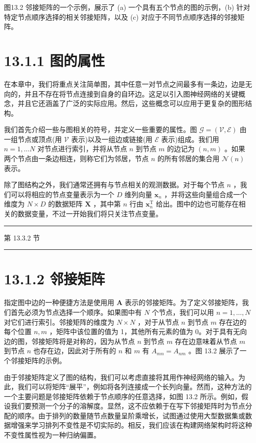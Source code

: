 \documentclass[10pt]{report}
\newcommand{\HRule}{\begin{center}\rule{0.9\linewidth}{0.2mm}\end{center}}
\begin{document}
图13.2 邻接矩阵的一个示例，展示了 (a) 一个具有五个节点的图的示例，(b) 针对特定节点顺序选择的相关邻接矩阵，以及 (c) 对应于不同节点顺序选择的邻接矩阵。

\section*{13.1.1 图的属性}

在本章中，我们将重点关注简单图，其中任意一对节点之间最多有一条边，边是无向的，并且不存在将节点连接到自身的自环边。这足以引入图神经网络的关键概念，并且它还涵盖了广泛的实际应用。然后，这些概念可以应用于更复杂的图形结构。

我们首先介绍一些与图相关的符号，并定义一些重要的属性。图 \(\mathcal{G} = \left( {\mathcal{V},\mathcal{E}}\right)\) 由一组节点或顶点(用 \(\mathcal{V}\) 表示)以及一组边或链接(用 \(\mathcal{E}\) 表示)组成。我们用 \(n = 1,\ldots N\) 对节点进行索引，并将从节点 \(n\) 到节点 \(m\) 的边记为 \(\left( {n,m}\right)\) 。如果两个节点由一条边相连，则称它们为邻居，节点 \(n\) 的所有邻居的集合用 \(\mathcal{N}\left( n\right)\) 表示。

除了图结构之外，我们通常还拥有与节点相关的观测数据。对于每个节点 \(n\) ，我们可以将相应的节点变量表示为一个 \(D\) 维列向量 \({\mathbf{x}}_{n}\) ，并将这些向量组合成一个维度为 \(N \times  D\) 的数据矩阵 \(\mathbf{X}\) ，其中第 \(n\) 行由 \({\mathbf{x}}_{n}^{\mathrm{T}}\) 给出。图中的边也可能存在相关的数据变量，不过一开始我们将只关注节点变量。

\HRule

第 13.3.2 节

\HRule

\section*{13.1.2 邻接矩阵}

指定图中边的一种便捷方法是使用用 \(\mathbf{A}\) 表示的邻接矩阵。为了定义邻接矩阵，我们首先必须为节点选择一个顺序。如果图中有 \(N\) 个节点，我们可以用 \(n = 1,\ldots ,N\) 对它们进行索引。邻接矩阵的维度为 \(N \times  N\) ，对于从节点 \(n\) 到节点 \(m\) 存在边的每个位置 \(n,m\) ，矩阵中该位置的值为 1，其他所有元素的值为 0。对于具有无向边的图，邻接矩阵将是对称的，因为从节点 \(n\) 到节点 \(m\) 存在边意味着从节点 \(m\) 到节点 \(n\) 也存在边，因此对于所有的 \(n\) 和 \(m\) 有 \({A}_{mn} = {A}_{nm}\) 。图 13.2 展示了一个邻接矩阵的示例。

由于邻接矩阵定义了图的结构，我们可以考虑直接将其用作神经网络的输入。为此，我们可以将矩阵“展平”，例如将各列连接成一个长列向量。然而，这种方法的一个主要问题是邻接矩阵依赖于节点顺序的任意选择，如图 13.2 所示。例如，假设我们要预测一个分子的溶解度。显然，这不应依赖于在写下邻接矩阵时为节点分配的顺序。由于排列的数量随节点数量呈阶乘增长，试图通过使用大型数据集或数据增强来学习排列不变性是不切实际的。相反，我们应该在构建网络架构时将这种不变性属性视为一种归纳偏置。
\end{document}

